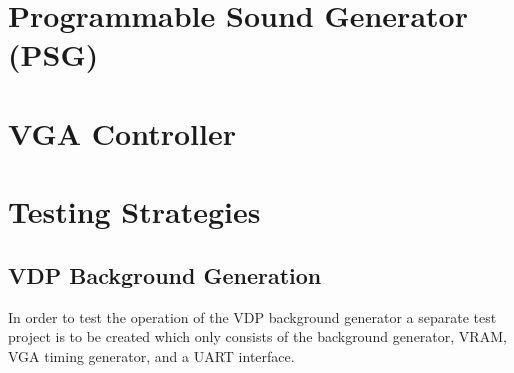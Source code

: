 \documentclass{article}
\begin{document}
\section{Programmable Sound Generator (PSG)}
\section{VGA Controller}

\newpage
\section{Testing Strategies}
\subsection{VDP Background Generation}

In order to test the operation of the VDP background generator a separate test
project is to be created which only consists of the background generator, VRAM,
VGA timing generator, and a UART interface.
\end{document}

